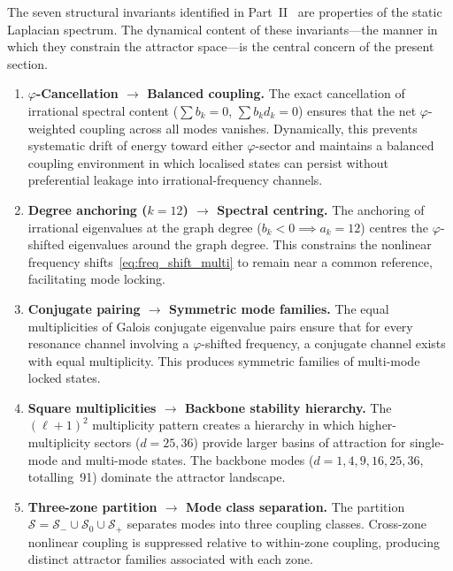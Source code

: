 \documentclass[12pt,a4paper]{article}
\newcommand{\vphi}{\varphi}
\begin{document}
The seven structural invariants identified in Part~II~\cite{paper2}
are properties of the static Laplacian spectrum.  The dynamical
content of these invariants---the manner in which they constrain the
attractor space---is the central concern of the present section.

\begin{enumerate}[nosep, leftmargin=*]

\item \textbf{$\vphi$-Cancellation $\to$ Balanced coupling.}
The exact cancellation of irrational spectral content
($\sum b_k = 0$, $\sum b_k d_k = 0$) ensures that the net
$\vphi$-weighted coupling across all modes vanishes.
Dynamically, this prevents systematic drift of energy toward
either $\vphi$-sector and maintains a balanced coupling
environment in which localised states can persist without
preferential leakage into irrational-frequency channels.

\item \textbf{Degree anchoring ($k=12$) $\to$ Spectral centring.}
The anchoring of irrational eigenvalues at the graph degree
($b_k < 0 \implies a_k = 12$) centres the $\vphi$-shifted
eigenvalues around the graph degree.  This constrains the
nonlinear frequency shifts~\eqref{eq:freq_shift_multi} to
remain near a common reference, facilitating mode locking.

\item \textbf{Conjugate pairing $\to$ Symmetric mode families.}
The equal multiplicities of Galois conjugate eigenvalue pairs
ensure that for every resonance channel involving a
$\vphi$-shifted frequency, a conjugate channel exists with
equal multiplicity.  This produces symmetric families of
multi-mode locked states.

\item \textbf{Square multiplicities $\to$ Backbone stability hierarchy.}
The $(\ell+1)^2$ multiplicity pattern creates a hierarchy in
which higher-multiplicity sectors ($d = 25, 36$) provide
larger basins of attraction for single-mode and multi-mode
states.  The backbone modes ($d = 1, 4, 9, 16, 25, 36$,
totalling~91) dominate the attractor landscape.

\item \textbf{Three-zone partition $\to$ Mode class separation.}
The partition $\mathcal{S} = \mathcal{S}_- \cup \mathcal{S}_0
\cup \mathcal{S}_+$ separates modes into three coupling classes.
Cross-zone nonlinear coupling is suppressed relative to
within-zone coupling, producing distinct attractor families
associated with each zone.


\end{enumerate}
\end{document}
